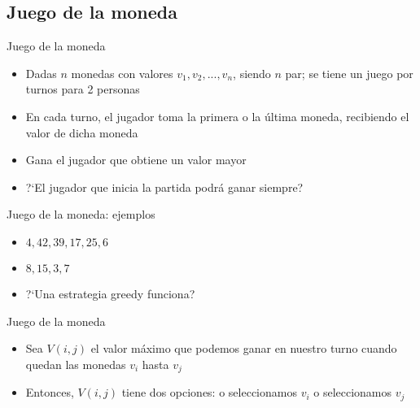 \documentclass[]{beamer}
\begin{document}
\subsection{Juego de la moneda}
\begin{frame}{Juego de la moneda}
  \begin{itemize}
    \item Dadas $n$ monedas con valores $v_1, v_2, ..., v_n$, siendo $n$ par; se tiene un juego por turnos para 2 personas
      \pause
    \item En cada turno, el jugador toma la primera o la \'ultima moneda, recibiendo el valor de dicha moneda
      \pause
    \item Gana el jugador que obtiene un valor mayor
      \pause
    \item ?`El jugador que inicia la partida podr\'a ganar siempre?
  \end{itemize}
\end{frame}

\begin{frame}{Juego de la moneda: ejemplos}
  \begin{itemize}
    \item $4, 42, 39, 17, 25, 6$
      \pause
    \item $8, 15, 3, 7$
      \pause
    \item ?`Una estrategia greedy funciona?
  \end{itemize}
\end{frame}

\begin{frame}{Juego de la moneda}
  \begin{itemize}
    \item Sea $V(i,j)$ el valor m\'aximo que podemos ganar en nuestro turno cuando quedan las monedas $v_i$ hasta $v_j$
      \pause
    \item Entonces, $V(i,j)$ tiene dos opciones: o seleccionamos $v_i$ o seleccionamos $v_j$
  \end{itemize}
\end{frame}
\end{document}
